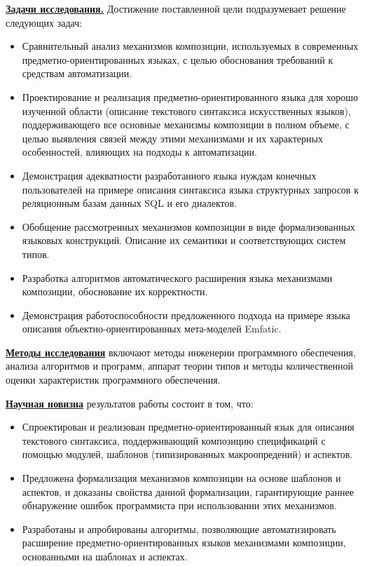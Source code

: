 \documentclass[12pt,a4paper]{article}
\newcommand{\afsubsection}[1]{\par \textbf{\underline{#1}}}
\begin{document}
\afsubsection{Задачи исследования.} Достижение поставленной цели подразумевает решение следующих задач:
\begin{itemize}
\item Сравнительный анализ механизмов композиции, используемых в современных предметно-ориентированных языках, с целью обоснования требований к средствам автоматизации.
\item Проектирование и реализация предметно-ориентированного языка для хорошо изученной области (описание текстового синтаксиса искусственных языков), поддерживающего все основные механизмы композиции в полном объеме, с целью выявления связей между этими механизмами и их характерных особенностей, влияющих на подходы к автоматизации.
\item Демонстрация адекватности разработанного языка нуждам конечных пользователей на примере описания синтаксиса языка структурных запросов к реляционным базам данных SQL и его диалектов.
\item Обобщение рассмотренных механизмов композиции в виде формализованных языковых конструкций. Описание их семантики и соответствующих систем типов.
\item Разработка алгоритмов автоматического расширения языка механизмами композиции, обоснование их корректности.
\item Демонстрация работоспособности предложенного подхода на примере языка описания объектно-ориентированных мета-моделей Emfatic.
\end{itemize}

\afsubsection{Методы исследования} включают методы инженерии программного обеспечения, анализа алгоритмов и программ, аппарат теории типов и методы количественной оценки характеристик программного обеспечения.

\afsubsection{Научная новизна} результатов работы состоит в том, что:
\begin{itemize}
\item Спроектирован и реализован предметно-ориентированный язык для описания текстового синтаксиса, поддерживающий композицию спецификаций с помощью модулей, шаблонов (типизированных макроопредений) и аспектов.
\item Предложена формализация механизмов композиции на основе шаблонов и аспектов, и доказаны свойства данной формализации, гарантирующие раннее обнаружение ошибок программиста при использовании этих механизмов.
\item Разработаны и апробированы алгоритмы, позволяющие автоматизировать расширение предметно-ориентированных языков механизмами композиции, основанными на шаблонах и аспектах.
\end{itemize}
\end{document}
